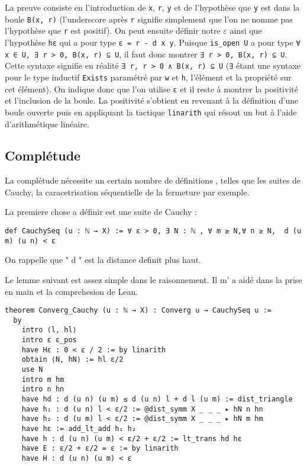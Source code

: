 \documentclass[a4paper, 12pt]{article}
\newcommand{\lean}[1]{\texttt{#1}}
\begin{document}
La preuve consiste en l'introduction de \lean{x}, \lean{r}, \lean{y} et de l'hypothèse que \lean{y} est dans la boule \lean{B(x, r)} (l'underscore après \lean{r} signifie simplement que l'on ne nomme pas l'hypothèse que \lean{r} est positif). On peut ensuite définir notre $ε$ ainsi que l'hypothèse \lean{hε} qui a pour type \lean{ε = r - d x y}. Puisque \lean{is_open U} a pour type \lean{∀ x ∈ U, ∃ r > 0, B(x, r) ⊆ U}, il faut donc montrer \lean{∃ r > 0, B(x, r) ⊆ U}. Cette syntaxe signifie en réalité \lean{∃ r, r > 0 ∧ B(x, r) ⊆ U} (\lean{∃} étant une syntaxe pour le type inductif \lean{Exists} paramétré par \lean{w} et \lean{h}, l'élément et la propriété sur cet élément). On indique donc que l'on utilise \lean{ε} et il reste à montrer la positivité et l'inclusion de la boule. La positivité s'obtient en revenant à la définition d'une boule ouverte puis en appliquant la tactique \lean{linarith} qui résout un but à l'aide d'arithmétique linéaire.

\subsection{Complétude}

La complétude nécessite un certain nombre de définitions , telles que les suites de Cauchy, la caracetrisation séquentielle de la fermeture par exemple.

La premiere chose a définir est une suite de Cauchy : 
\begin{verbatim}
def CauchySeq (u : ℕ → X) := ∀ ε > 0, ∃ N : ℕ , ∀ m ≥ N,∀ n ≥ N,  d (u m) (u n) < ε
\end{verbatim}

On rappelle que " d " est la distance definit plus haut.

 Le lemme suivant est assez simple dans le raisonnement. Il m' a aidé dans la prise en main et la comprehesion de Lean. 

\begin{verbatim}
theorem Converg_Cauchy (u : ℕ → X) : Converg u → CauchySeq u :=
  by
    intro ⟨l, hl⟩
    intro ε ε_pos
    have Hε : 0 < ε / 2 := by linarith
    obtain ⟨N, hN⟩ := hl ε/2
    use N
    intro m hm
    intro n hn
    have hd : d (u n) (u m) ≤ d (u n) l + d l (u m) := dist_triangle
    have h₁ : d (u n) l < ε/2 := @dist_symm X _ _ _ ▸ hN n hn
    have h₂ : d (u m) l < ε/2 := @dist_symm X _ _ _ ▸ hN m hm
    have hε := add_lt_add h₁ h₂
    have h : d (u n) (u m) < ε/2 + ε/2 := lt_trans hd hε
    have E : ε/2 + ε/2 = ε := by linarith
    have H : d (u n) (u m) < ε
    
\end{verbatim}
\end{document}
